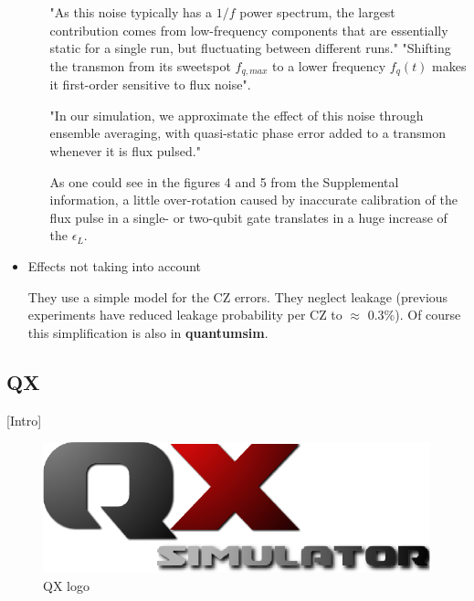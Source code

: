 \begin{itemize}
\begin{itemize}
"As this noise typically has a \(1/f\) power spectrum, the largest contribution comes from low-frequency components that are essentially static for a single run, but fluctuating between different runs."
"Shifting the transmon from its sweetspot \(f_{q,max}\) to a lower frequency \(f_q (t)\) makes it first-order sensitive to flux noise".

"In our simulation, we approximate the effect of this noise through ensemble averaging, with quasi-static phase error added to a transmon whenever it is flux pulsed."

As one could see in the figures 4 and 5 from the Supplemental information, a little over-rotation  caused by inaccurate calibration of the flux pulse in a single- or two-qubit gate translates in a huge increase of the \(\epsilon_L\).
\end{itemize}


\item Effects not taking into account
\label{sec:org47402d0}

They use a simple model for the CZ errors.
They neglect leakage (previous experiments have reduced leakage probability per CZ to \(\approx\) 0.3\%).
Of course this simplification is also in \textbf{quantumsim}.
\end{itemize}

\subsection*{QX}
\label{sec:org89503f1}

[Intro]

\begin{figure}
\centering
\begin{minipage}{.4\textwidth}

\begin{center}
\includegraphics[width=.9\linewidth]{figures/qx.png}
\end{center}

\caption{QX logo}
\label{fig:qx_logo}
\end{minipage}
\end{figure}

